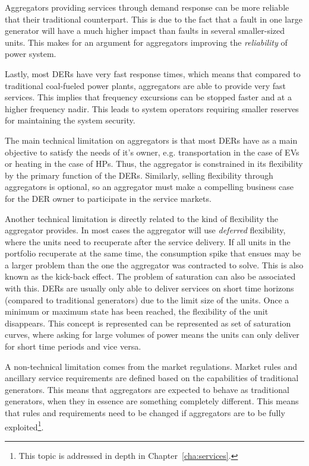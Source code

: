 Aggregators providing services through demand response can be more reliable that their traditional counterpart. This is due to the fact that a fault in one large generator will have a much higher impact than faults in several smaller-sized units. This makes for an argument for aggregators improving the \emph{reliability} of power system.

Lastly, most DERs have very fast response times, which means that compared to traditional coal-fueled power plants, aggregators are able to provide very fast services. This implies that frequency excursions can be stopped faster and at a higher frequency nadir. This leads to system operators requiring smaller reserves for maintaining  the system security.

The main technical limitation on aggregators is that most DERs have as a main objective to satisfy the needs of it's owner, e.g. transportation in the case of EVs or heating in the case of HPs. Thus, the aggregator is constrained in its flexibility by the primary function of the DERs. Similarly, selling flexibility through aggregators is optional, so an aggregator must make a compelling business case for the DER owner to participate in the service markets.

Another technical limitation is directly related to the kind of flexibility the aggregator provides. In most cases the aggregator will use \emph{deferred} flexibility, where the units need to recuperate after the service delivery. If all units in the portfolio recuperate at the same time, the consumption spike that ensues may be a larger problem than the one the aggregator was contracted to solve. This is also known as the kick-back effect. The problem of saturation can also be associated with this. DERs are usually only able to deliver services on short time horizons (compared to traditional generators) due to the limit size of the units. Once a minimum or maximum state has been reached, the flexibility of the unit disappears. This concept is represented can be represented as set of saturation curves, where asking for large volumes of power means the units can only deliver for short time periods and vice versa.

A non-technical limitation comes from the market regulations. Market rules and ancillary service requirements are defined based on the capabilities of traditional generators. This means that aggregators are expected to behave as traditional generators, when they in essence are something completely different. This means that rules and requirements need to be changed if aggregators are to be fully exploited\footnote{This topic is addressed in depth in Chapter~\ref{cha:services}.}.

